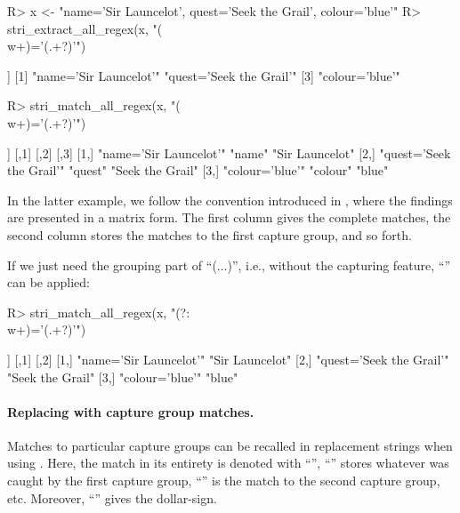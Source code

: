 \documentclass[nojss]{jss}
\newcommand{\str}[1]{\code{{#1}}}
\begin{document}
\begin{Schunk}
\begin{Sinput}
R> x <- "name='Sir Launcelot', quest='Seek the Grail', colour='blue'"
R> stri_extract_all_regex(x, "(\\w+)='(.+?)'")
\end{Sinput}
\begin{Soutput}
[[1]]
[1] "name='Sir Launcelot'"   "quest='Seek the Grail'"
[3] "colour='blue'"
\end{Soutput}
\begin{Sinput}
R> stri_match_all_regex(x, "(\\w+)='(.+?)'")
\end{Sinput}
\begin{Soutput}
[[1]]
     [,1]                     [,2]     [,3]
[1,] "name='Sir Launcelot'"   "name"   "Sir Launcelot"
[2,] "quest='Seek the Grail'" "quest"  "Seek the Grail"
[3,] "colour='blue'"          "colour" "blue"
\end{Soutput}
\end{Schunk}

In the latter example, we follow the convention introduced in ,
where the findings are presented in a matrix form. The first column
gives the complete matches, the second column stores the matches to the
first capture group, and so forth.

If we just need the grouping part of ``\code(...)'', i.e.,
without the capturing feature,
``'' can be applied:

\begin{Schunk}
\begin{Sinput}
R> stri_match_all_regex(x, "(?:\\w+)='(.+?)'")
\end{Sinput}
\begin{Soutput}
[[1]]
     [,1]                     [,2]
[1,] "name='Sir Launcelot'"   "Sir Launcelot"
[2,] "quest='Seek the Grail'" "Seek the Grail"
[3,] "colour='blue'"          "blue"
\end{Soutput}
\end{Schunk}


\paragraph{Replacing with capture group matches.}
Matches to particular capture groups can be recalled in replacement strings
when using .
Here, the match in its entirety is denoted with ``\str{\$0}'',
``\str{\$1}'' stores whatever was caught by the first capture group,
``\str{\$2}'' is the match to the second capture group, etc.
Moreover, ``\str{\textbackslash{}\$}'' gives the dollar-sign.
\end{document}
